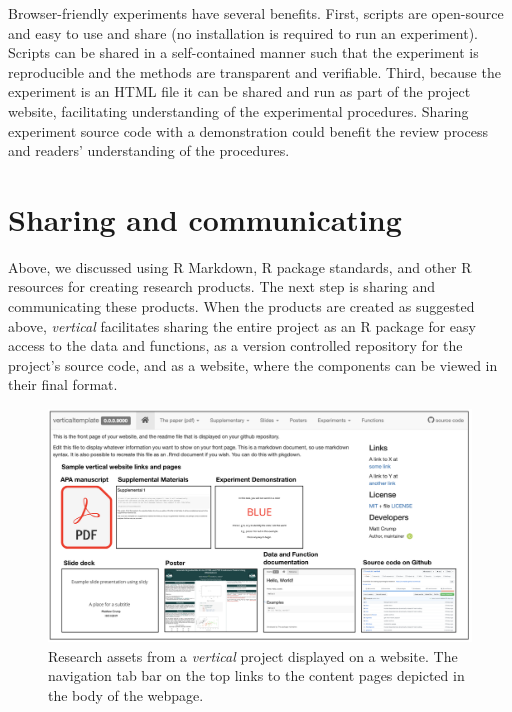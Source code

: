 \documentclass[
  english,
  jou,floatsintext]{apa6}
\begin{document}
Browser-friendly experiments have several benefits. First, scripts are open-source and easy to use and share (no installation is required to run an experiment). Scripts can be shared in a self-contained manner such that the experiment is reproducible and the methods are transparent and verifiable. Third, because the experiment is an HTML file it can be shared and run as part of the project website, facilitating understanding of the experimental procedures. Sharing experiment source code with a demonstration could benefit the review process and readers' understanding of the procedures.

\hypertarget{sharing-and-communicating}{%
\section{Sharing and communicating}\label{sharing-and-communicating}}

Above, we discussed using R Markdown, R package standards, and other R resources for creating research products. The next step is sharing and communicating these products. When the products are created as suggested above, \emph{vertical} facilitates sharing the entire project as an R package for easy access to the data and functions, as a version controlled repository for the project's source code, and as a website, where the components can be viewed in their final format.

\begin{figure}

{\centering \includegraphics[width=\textwidth]{images/vertical-website} 

}

\caption{Research assets from a \emph{vertical} project displayed on a website. The navigation tab bar on the top links to the content pages depicted in the body of the webpage.}\label{fig:vertical-project-website}
\end{figure}
\end{document}
